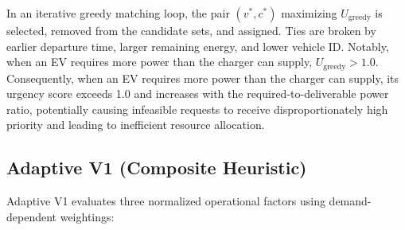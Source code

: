 \documentclass[conference]{IEEEtran}
\begin{document}
In an iterative greedy matching loop, the pair $(v^*, c^*)$ maximizing $U_{\mathrm{greedy}}$ is selected, removed from the candidate sets, and assigned. Ties are broken by earlier departure time, larger remaining energy, and lower vehicle ID. Notably, when an EV requires more power than the charger can supply, $U_{\mathrm{greedy}} > 1.0$. Consequently, when an EV requires more power than the charger can supply, its urgency score exceeds 1.0 and increases with the required-to-deliverable power ratio, potentially causing infeasible requests to receive disproportionately high priority and leading to inefficient resource allocation.

\subsection{Adaptive V1 (Composite Heuristic)}
Adaptive V1 evaluates three normalized operational factors using demand-dependent weightings:
\end{document}
